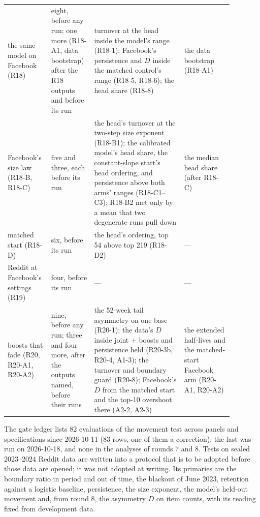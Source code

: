 \documentclass[10pt]{article}
\begin{document}
{\begin{longtable}{>{\raggedright\arraybackslash}p{0.14\linewidth}>{\raggedright\arraybackslash}p{0.17\linewidth}>{\raggedright\arraybackslash}p{0.37\linewidth}>{\raggedright\arraybackslash}p{0.2\linewidth}}
the same model on Facebook (R18) & eight, before any run; one more (R18-A1, data bootstrap) after the R18 outputs and before its run & turnover at the head inside the model's range (R18-1); Facebook's persistence and $D$ inside the matched control's range (R18-5, R18-6); the head share (R18-8) & the data bootstrap (R18-A1)\\
Facebook's size law (R18-B, R18-C) & five and three, each before its run & the head's turnover at the two-step size exponent (R18-B1); the calibrated model's head share, the constant-slope start's head ordering, and persistence above both arms' ranges (R18-C1--C3); R18-B2 met only by a mean that two degenerate runs pull down & the median head share (after R18-C)\\
matched start (R18-D) & six, before its run & the head's ordering, top 54 above top 219 (R18-D2) & ---\\
Reddit at Facebook's settings (R19) & four, before its run & --- & ---\\
boosts that fade (R20, R20-A1, R20-A2) & nine, before any run; three and four more, after the outputs named, before their runs & the 52-week tail asymmetry on one base (R20-1); the data's $D$ inside joint + boosts and persistence held (R20-3b, R20-4, A1-3); the turnover and boundary guard (R20-8); Facebook's $D$ from the matched start and the top-10 overshoot there (A2-2, A2-3) & the extended half-lives and the matched-start Facebook arm (R20-A1, R20-A2)\\
\bottomrule
\end{longtable}}
The gate ledger lists 82 evaluations of the movement test across panels and specifications since 2026-10-11 (83 rows, one of them a correction); the last was run on 2026-10-18, and none in the analyses of rounds 7 and 8. Tests on sealed 2023--2024 Reddit data are written into a protocol that is to be adopted before those data are opened; it was not adopted at writing. Its primaries are the boundary ratio in period and out of time, the blackout of June 2023, retention against a logistic baseline, persistence, the size exponent, the model's held-out movement and, from round 8, the asymmetry $D$ on item counts, with its reading fixed from development data.
\end{document}
